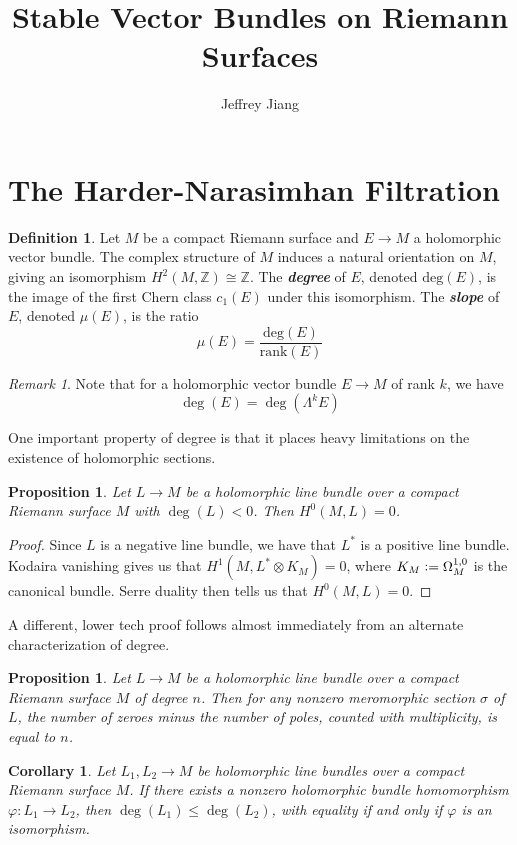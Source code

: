 \documentclass[psamsfonts, 12pt]{amsart}
\newtheorem{cor}[thm]{Corollary}
\newtheorem{prop}[thm]{Proposition}
\theoremstyle{definition}
\newtheorem{defn}[thm]{Definition}
\theoremstyle{remark}
\newtheorem*{rem*}{Remark}
\newcommand{\ib}[1]{\textbf{\textit{#1}}}
\newcommand{\Z}{\mathbb{Z}}
\newcommand{\defeq}{\vcentcolon=}
\begin{document}
%
\author{Jeffrey Jiang}
%
\title{Stable Vector Bundles on Riemann Surfaces}
%
\maketitle
%
\section{The Harder-Narasimhan Filtration}
%
\begin{defn}
Let $M$ be a compact Riemann surface and $E \to M$ a holomorphic vector bundle.
The complex structure of $M$ induces a natural orientation on $M$, giving an
isomorphism $H^2(M,\Z) \cong \Z$. The \ib{degree} of $E$, denoted
$\mathrm{deg}(E)$, is the image of the first Chern class $c_1(E)$ under this
isomorphism. The \ib{slope} of $E$, denoted $\mu(E)$, is the ratio
\[
\mu(E) = \frac{\mathrm{deg}(E)}{\mathrm{rank}(E)}
\]
\end{defn}
%
\begin{rem*}
Note that for a holomorphic vector bundle $E \to M$ of rank $k$, we have
\[
\deg(E) = \deg(\Lambda^kE)
\]
\end{rem*}
%
One important property of degree is that it places heavy limitations on the existence
of holomorphic sections.
%
\begin{prop}
Let $L \to M$ be a holomorphic line bundle over a compact Riemann surface $M$ with
$\deg(L) < 0$. Then $H^0(M,L) = 0$.
\end{prop}
%
\begin{proof}
Since $L$ is a negative line bundle, we have that $L^*$ is a positive line bundle.
Kodaira vanishing gives us that $H^1(M, L^* \otimes K_M) = 0$, where
$K_M \defeq \Omega^{1,0}_M$ is the canonical bundle. Serre duality then
tells us that $H^0(M, L) = 0$.
\end{proof}
%
A different, lower tech proof follows almost immediately from an alternate
characterization of degree.
%
\begin{prop}
Let $L \to M$ be a holomorphic line bundle over a compact Riemann surface $M$
of degree $n$. Then for any nonzero meromorphic section $\sigma$ of $L$,
the number of zeroes minus the number of poles, counted with multiplicity,
is equal to $n$.
\end{prop}
%
\begin{cor}
Let $L_1,L_2 \to M$ be holomorphic line bundles over a compact Riemann surface $M$.
If there exists a nonzero holomorphic bundle homomorphism $\varphi : L_1 \to L_2$, then
$\deg(L_1) \leq \deg(L_2)$, with equality if and only if $\varphi$ is an isomorphism.
\end{cor}
\end{document}
